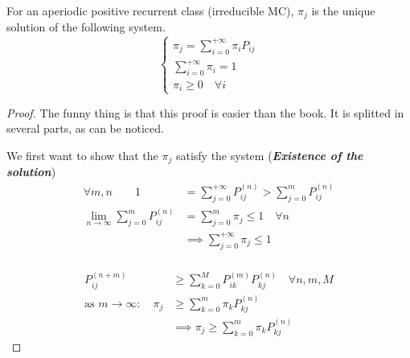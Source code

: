	\begin{theorem}[1.3 (K.T. pp 85-86)]
		For an aperiodic positive recurrent class (irreducible MC), $\pi_j$ is the unique solution of the following system.
		\begin{equation*}\begin{cases}
			\pi_j = \sum\limits_{i=0}^{+\infty} \pi_i P_{ij} \\
			\sum\limits_{i=0}^{+\infty} \pi_i = 1 \\
			\pi_i \geq 0 \quad \forall i
		\end{cases}\end{equation*}
	\end{theorem}

	\begin{proof} The funny thing is that this proof is easier than the book.
		It is splitted in several parts, as can be noticed.

		\proofpart
			We first want to show that the $\pi_j$ satisfy the system (\textbf{\textit{Existence of the solution}})
			\begin{equation*}
				\begin{split}
					\forall m,n \qquad 1&=\sum\limits_{j=0}^{+\infty} P_{ij}^{(n)} > \sum\limits_{j=0}^m P_{ij}^{(n)}\\
	 			 \lim_{n\to\infty} \sum\limits_{j=0}^m P_{ij}^{(n)} &= \sum\limits_{j=0}^m \pi_j \leq 1 \quad \forall n \\
				 &\implies \sum\limits_{j=0}^{+\infty} \pi_j \leq 1\\
				\end{split}
			\end{equation*}

		\proofpart
			\begin{equation*}
				\begin{split}
					P_{ij}^{(n+m)} &\geq \sum\limits_{k=0}^M P_{ik}^{(m)} P_{kj}^{(n)} \quad \forall n, m, M\\
					\text{as } m \to \infty :\quad \pi_j &\geq \sum\limits_{k=0}^m \pi_k P_{kj}^{(n)}\\
					&\implies  \pi_j \geq \sum\limits_{k=0}^m \pi_k P_{kj}^{(n)}
				\end{split}
			\end{equation*}


\end{proof}
